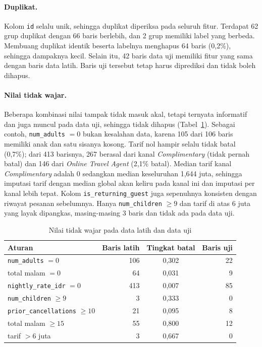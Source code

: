 \paragraph{Duplikat.} Kolom \texttt{id} selalu unik, sehingga duplikat diperiksa pada seluruh fitur. Terdapat 62 grup duplikat dengan 66 baris berlebih, dan 2 grup memiliki label yang berbeda. Membuang duplikat identik beserta labelnya menghapus 64 baris (0,2\%), sehingga dampaknya kecil. Selain itu, 42 baris data uji memiliki fitur yang sama dengan baris data latih. Baris uji tersebut tetap harus diprediksi dan tidak boleh dihapus.

\paragraph{Nilai tidak wajar.} Beberapa kombinasi nilai tampak tidak masuk akal, tetapi ternyata informatif dan juga muncul pada data uji, sehingga tidak dihapus (Tabel~\ref{tab:anomali}). Sebagai contoh, \texttt{num\_adults} $=0$ bukan kesalahan data, karena 105 dari 106 baris memiliki anak dan satu sisanya kosong. Tarif nol hampir selalu tidak batal (0,7\%); dari 413 barisnya, 267 berasal dari kanal \textit{Complimentary} (tidak pernah batal) dan 146 dari \textit{Online Travel Agent} (2,1\% batal). Median tarif kanal \textit{Complimentary} adalah 0 sedangkan median keseluruhan 1,644 juta, sehingga imputasi tarif dengan median global akan keliru pada kanal ini dan imputasi per kanal lebih tepat. Kolom \texttt{is\_\allowbreak returning\_\allowbreak guest} juga sepenuhnya konsisten dengan riwayat pesanan sebelumnya. Hanya \texttt{num\_children} $\ge 9$ dan tarif di atas 6 juta yang layak dipangkas, masing-masing 3 baris dan tidak ada pada data uji.

\begin{table}[H]
	\centering
	\caption{Nilai tidak wajar pada data latih dan data uji}
	\label{tab:anomali}
	\begin{tabular}{l r c r}
		\toprule
		\textbf{Aturan} & \textbf{Baris latih} & \textbf{Tingkat batal} & \textbf{Baris uji} \\
		\midrule
		\texttt{num\_adults} $= 0$ & 106 & 0,302 & 22 \\
		total malam $= 0$ & 64 & 0,031 & 9 \\
		\texttt{nightly\_\allowbreak rate\_\allowbreak idr} $= 0$ & 413 & 0,007 & 85 \\
		\texttt{num\_children} $\ge 9$ & 3 & 0,333 & 0 \\
		\texttt{prior\_\allowbreak cancellations} $\ge 10$ & 21 & 0,095 & 8 \\
		total malam $\ge 15$ & 55 & 0,800 & 12 \\
		tarif $> 6$ juta & 3 & 0,667 & 0 \\
		\bottomrule
	\end{tabular}
\end{table}

